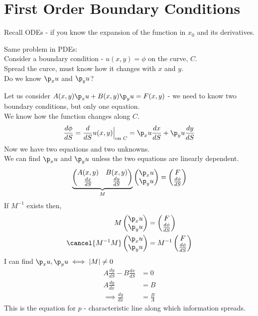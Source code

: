 \documentclass[Maths.tex]{subfiles}
\begin{document}
\section{First Order Boundary Conditions}
Recall ODEs - if you know the expansion of the function in $x_0$ and its derivatives.

Same problem in PDEs: \\
Consider a boundary condition - $u(x,y) = \phi$ on the curve, $C$. \\
Spread the curce, must know how it changes with $x$ and $y$. \\
Do we know $\p_xu$ and $\p_yu$?

Let us consider $A(x,y)\p_xu + B(x,y)\p_yu = F(x,y)$ - we need to know two boundary conditions, but only one equation.  \\
We know how the function changes along $C$.
\begin{equation}
	\frac{d\phi}{dS} = \frac{d}{dS}u(x,y)\Big|_{\text{on }C} = \p_xu\frac{dx}{dS} + \p_yu\frac{dy}{dS}
\end{equation}
Now we have two equations and two unknowns. \\
We can find $\p_xu$ and $\p_yu$ unless the two equations are linearly dependent.
\begin{equation}
	\underbrace{\begin{pmatrix} A(x,y) & B(x,y) \\ \frac{dx}{dS} & \frac{dy}{dS} \end{pmatrix}}_{M} \begin{pmatrix} \p_xu \\ \p_yu \end{pmatrix} = \begin{pmatrix} F \\ \frac{d\phi}{dS} \end{pmatrix}
\end{equation}
If $M^{-1}$ exists then,
\begin{align}
	M\begin{pmatrix} \p_xu \\ \p_yu \end{pmatrix} &= \begin{pmatrix} F \\ \frac{d\phi}{dS} \end{pmatrix} \\
	\cancel{M^{-1}M}\begin{pmatrix} \p_xu \\ \p_yu \end{pmatrix} &= M^{-1}\begin{pmatrix} F \\ \frac{d\phi}{dS} \end{pmatrix}
\end{align}
I can find $\p_xu,\p_yu \iff |M| \neq 0$
\begin{align}
	A\frac{dy}{dS} - B\frac{dx}{dS} &= 0 \\
	A\frac{dy}{dx} &= B \\
	\implies \frac{dy}{dx} &= \frac{B}{A}
\end{align}
This is the equation for $p$ - characteristic line along which information spreads.
\end{document}
